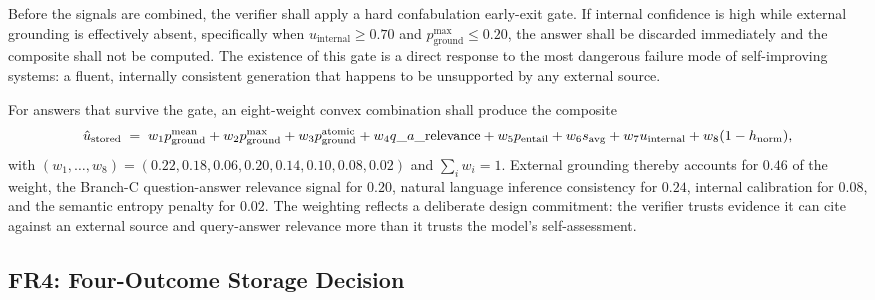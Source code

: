 Before the signals are combined, the verifier shall apply a hard confabulation early-exit gate. If internal confidence is high while external grounding is effectively absent, specifically when $u_{\text{internal}} \geq 0.70$ and $p_{\text{ground}}^{\text{max}} \leq 0.20$, the answer shall be discarded immediately and the composite shall not be computed. The existence of this gate is a direct response to the most dangerous failure mode of self-improving systems: a fluent, internally consistent generation that happens to be unsupported by any external source.

For answers that survive the gate, an eight-weight convex combination shall produce the composite
\begin{equation}
\hat{u}_{\text{stored}} \;=\;
w_1 p_{\text{ground}}^{\text{mean}} +
w_2 p_{\text{ground}}^{\text{max}} +
w_3 p_{\text{ground}}^{\text{atomic}} +
w_4 q\_a\_\text{relevance} +
w_5 p_{\text{entail}} +
w_6 s_{\text{avg}} +
w_7 u_{\text{internal}} +
w_8 (1 - h_{\text{norm}}),
\label{eq:ustored}
\end{equation}
with $(w_1, \ldots, w_8) = (0.22, 0.18, 0.06, 0.20, 0.14, 0.10, 0.08, 0.02)$ and $\sum_i w_i = 1$. External grounding thereby accounts for $0.46$ of the weight, the Branch-C question-answer relevance signal for $0.20$, natural language inference consistency for $0.24$, internal calibration for $0.08$, and the semantic entropy penalty for $0.02$. The weighting reflects a deliberate design commitment: the verifier trusts evidence it can cite against an external source and query-answer relevance more than it trusts the model's self-assessment.

\subsection{FR4: Four-Outcome Storage Decision}
\label{sec:fr4}

